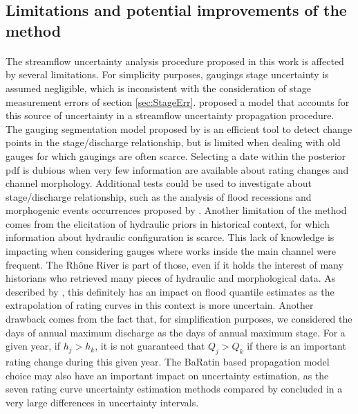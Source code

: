 \documentclass[11pt]{article}
\begin{document}
    
    \subsection{Limitations and potential improvements of the method}
    \paragraph{}
    The streamflow uncertainty analysis procedure proposed in this work is affected by several limitations. For simplicity purposes, gaugings stage uncertainty is assumed negligible, which is inconsistent with the consideration of stage measurement errors of section \ref{sec:StageErr}. \citet{horner_impact_2018} proposed a model that accounts for this source of uncertainty in a streamflow uncertainty propagation procedure. The gauging segmentation model proposed by \citet{darienzo_detection_2021} is an efficient tool to detect change points in the stage/discharge relationship, but is limited when dealing with old gauges for which gaugings are often scarce. Selecting a date within the posterior pdf is dubious when very few information are available about rating changes and channel morphology. Additional tests could be used to investigate about stage/discharge relationship, such as the analysis of flood recessions and morphogenic events occurrences proposed by \citet{darienzo_detection_2021-1}. Another limitation of the method comes from the elicitation of hydraulic priors in historical context, for which information about hydraulic configuration is scarce. This lack of knowledge is impacting when considering gauges where works inside the main channel were frequent. The Rhône River is part of those, even if it holds the interest of many historians who retrieved many pieces of hydraulic and morphological data. As described by \citet{petersen-overleir_accounting_2009}, this definitely has an impact on flood quantile estimates as the extrapolation of rating curves in this context is more uncertain. Another drawback comes from the fact that, for simplification purposes, we considered the days of annual maximum discharge as the days of annual maximum stage. For a given year, if $h_{j} > h_{k}$, it is not guaranteed that $Q_{j} > Q_{k}$ if there is an important rating change during this given year. The BaRatin \citep{le_coz_combining_2014} based propagation model choice may also have an important impact on uncertainty estimation, as the seven rating curve uncertainty estimation methods compared by \citet{kiang_comparison_2018} concluded in a very large differences in uncertainty intervals. 
\end{document}
